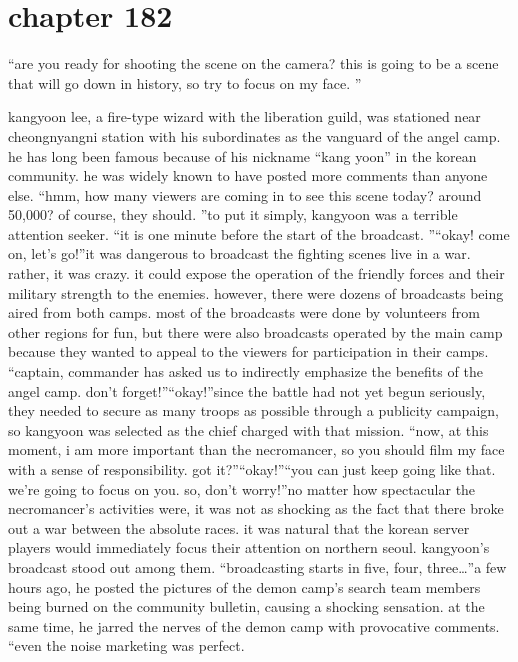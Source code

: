\section{chapter 182}

                            “are you ready for shooting the scene on the camera? this is going to be a scene that will go down in history, so try to focus on my face.
”




kangyoon lee, a fire-type wizard with the liberation guild, was stationed near cheongnyangni station with his subordinates as the vanguard of the angel camp.
he has long been famous because of his nickname “kang yoon” in the korean community.
 he was widely known to have posted more comments than anyone else.
“hmm, how many viewers are coming in to see this scene today? around 50,000? of course, they should.
”to put it simply, kangyoon was a terrible attention seeker.
“it is one minute before the start of the broadcast.
”“okay! come on, let’s go!”it was dangerous to broadcast the fighting scenes live in a war.
 rather, it was crazy.
 it could expose the operation of the friendly forces and their military strength to the enemies.
however, there were dozens of broadcasts being aired from both camps.
 most of the broadcasts were done by volunteers from other regions for fun, but there were also broadcasts operated by the main camp because they wanted to appeal to the viewers for participation in their camps.
“captain, commander has asked us to indirectly emphasize the benefits of the angel camp.
 don’t forget!”“okay!”since the battle had not yet begun seriously, they needed to secure as many troops as possible through a publicity campaign, so kangyoon was selected as the chief charged with that mission.
 “now, at this moment, i am more important than the necromancer, so you should film my face with a sense of responsibility.
 got it?”“okay!”“you can just keep going like that.
 we’re going to focus on you.
 so, don’t worry!”no matter how spectacular the necromancer’s activities were, it was not as shocking as the fact that there broke out a war between the absolute races.
it was natural that the korean server players would immediately focus their attention on northern seoul.
 kangyoon’s broadcast stood out among them.
“broadcasting starts in five, four, three…”a few hours ago, he posted the pictures of the demon camp’s search team members being burned on the community bulletin, causing a shocking sensation.
at the same time, he jarred the nerves of the demon camp with provocative comments.
“even the noise marketing was perfect.
